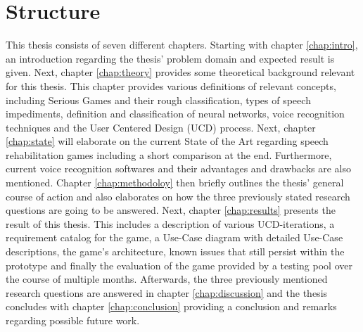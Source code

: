 \documentclass[draft,final]{vutinfth} %
\begin{document}
\section{Structure}
This thesis consists of seven different chapters. Starting with chapter \ref{chap:intro}, an introduction regarding the thesis' problem domain and expected result is given. Next, chapter \ref{chap:theory} provides some theoretical background relevant for this thesis. This chapter provides various definitions of relevant concepts, including Serious Games and their rough classification, types of speech impediments, definition and classification of neural networks, voice recognition techniques and the User Centered Design (UCD) process. Next, chapter \ref{chap:state} will elaborate on the current State of the Art regarding speech rehabilitation games including a short comparison at the end. Furthermore, current voice recognition softwares and their advantages and drawbacks are also mentioned. Chapter \ref{chap:methodoloy} then briefly outlines the thesis' general course of action and also elaborates on how the three previously stated research questions are going to be answered. Next, chapter \ref{chap:results} presents the result of this thesis. This includes a description of various UCD-iterations, a requirement catalog for the game, a Use-Case diagram with detailed Use-Case descriptions, the game's architecture, known issues that still persist within the prototype and finally the evaluation of the game provided by a testing pool over the course of multiple months. Afterwards, the three previously mentioned research questions are answered in chapter \ref{chap:discussion} and the thesis concludes with chapter \ref{chap:conclusion} providing a conclusion and remarks regarding possible future work.
\end{document}
